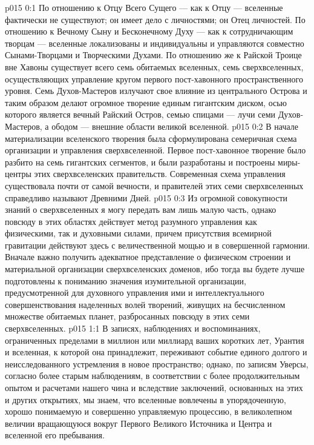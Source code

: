 \author{Вселенский Цензор}
\vs p015 0:1 По отношению к Отцу Всего Сущего --- как к Отцу --- вселенные фактически не существуют; он имеет дело с личностями; он Отец личностей. По отношению к Вечному Сыну и Бесконечному Духу --- как к сотрудничающим творцам --- вселенные локализованы и индивидуальны и управляются совместно Сынами\hyp{}Творцами и Творческими Духами. По отношению же к Райской Троице вне Хавоны существует всего семь обитаемых вселенных, семь сверхвселенных, осуществляющих управление кругом первого пост\hyp{}хавонного пространственного уровня. Семь Духов\hyp{}Мастеров излучают свое влияние из центрального Острова и таким образом делают огромное творение единым гигантским диском, осью которого является вечный Райский Остров, семью спицами --- лучи семи Духов\hyp{}Мастеров, а ободом --- внешние области великой вселенной.
\vs p015 0:2 В начале материализации вселенского творения была сформулирована семеричная схема организации и управления сверхвселенной. Первое пост\hyp{}хавонное творение было разбито на семь гигантских сегментов, и были разработаны и построены миры\hyp{}центры этих сверхвселенских правительств. Современная схема управления существовала почти от самой вечности, и правителей этих семи сверхвселенных справедливо называют Древними Дней.
\vs p015 0:3 Из огромной совокупности знаний о сверхвселенных я могу передать вам лишь малую часть, однако повсюду в этих областях действует метод разумного управления как физическими, так и духовными силами, причем присутствия всемирной гравитации действуют здесь с величественной мощью и в совершенной гармонии. Вначале важно получить адекватное представление о физическом строении и материальной организации сверхвселенских доменов, ибо тогда вы будете лучше подготовлены к пониманию значения изумительной организации, предусмотренной для духовного управления ими и интеллектуального совершенствования наделенных волей творений, живущих на бесчисленном множестве обитаемых планет, разбросанных повсюду в этих семи сверхвселенных.
\vs p015 1:1 В записях, наблюдениях и воспоминаниях, ограниченных пределами в миллион или миллиард ваших коротких лет, Урантия и вселенная, к которой она принадлежит, переживают событие единого долгого и неисследованного устремления в новое пространство; однако, по записям Уверсы, согласно более старым наблюдениям, в соответствии с более продолжительным опытом и расчетами нашего чина и вследствие заключений, основанных на этих и других открытиях, мы знаем, что вселенные вовлечены в упорядоченную, хорошо понимаемую и совершенно управляемую процессию, в великолепном величии вращающуюся вокруг Первого Великого Источника и Центра и вселенной его пребывания.
